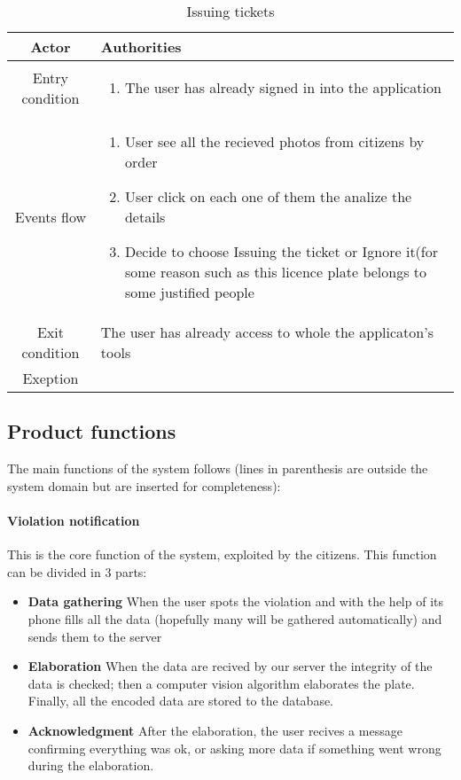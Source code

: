 \documentclass{article}
\begin{document}
		\begin{table} [H]
		\begin{center}
		\caption{Issuing tickets}
		\begin{tabular}{|c|p{8cm}|}
			\hline
			Actor&Authorities\\
			\hline
			Entry condition&
				\begin{enumerate}
					\item The user has already signed in into the application
				\end{enumerate}\\
			\hline
			 Events flow&
			\begin{enumerate}
			\item User see all the recieved photos from citizens by order
			\item User click on each one of them the analize the details
			\item Decide to choose Issuing the ticket or Ignore it(for some reason such as this licence plate belongs to some 					justified people
			\end{enumerate}\\
			\hline
			Exit condition& The user has already access to whole the applicaton's tools\\
			\hline
			Exeption&
		\\
			\hline
		\end{tabular}
				
		\end{center}


		\end{table} 
	\subsection{Product functions}
	The main functions of the system follows (lines in parenthesis are outside the system domain but are inserted for completeness):
		\paragraph{Violation notification}
			This is the core function of the system, exploited by the citizens.
			This function can be divided in 3 parts:
				\begin{itemize}
					\item \textbf{Data gathering}
					When the user spots the violation and with the help of its phone fills all the data (hopefully many will be gathered automatically) and sends them to the server
					\item \textbf{Elaboration}
					When the data are recived by our server the integrity of the data is checked; then a computer vision algorithm elaborates the plate. Finally, all the encoded data are stored to the database.
					\item \textbf{Acknowledgment}
					After the elaboration, the user recives a message confirming everything was ok, or asking more data if something went wrong during the elaboration.
				\end{itemize}
				
\end{document}
